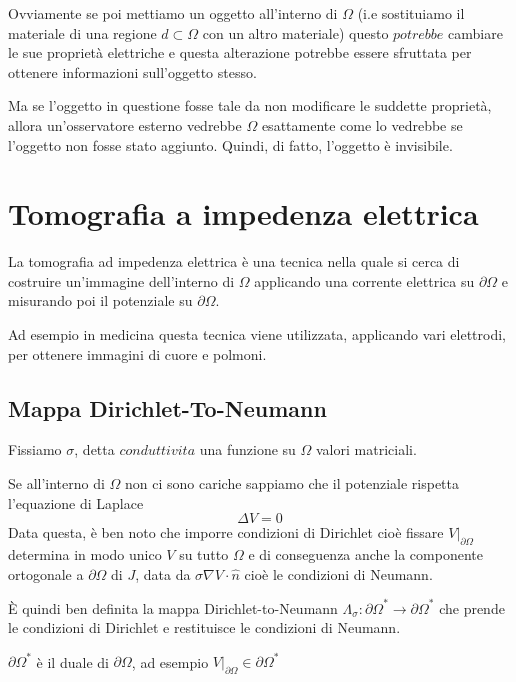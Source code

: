 \documentclass{book}
\begin{document}
Ovviamente se poi mettiamo un oggetto all'interno di $\Omega$ (i.e sostituiamo il materiale di una regione $d\subset\Omega$ con un altro materiale) questo $potrebbe$ cambiare le sue proprietà elettriche e questa alterazione potrebbe essere sfruttata per ottenere informazioni sull'oggetto stesso.

Ma se l'oggetto in questione fosse tale da non modificare le suddette proprietà, allora un'osservatore esterno vedrebbe $\Omega$ esattamente come lo vedrebbe se l'oggetto non fosse stato aggiunto. Quindi, di fatto, l'oggetto è invisibile.






\chapter{Tomografia a impedenza elettrica}
La tomografia ad impedenza elettrica è una tecnica nella quale si cerca di costruire un'immagine dell'interno di $\Omega$ applicando una corrente elettrica su $\partial\Omega$ e misurando poi il potenziale su $\partial\Omega$.

Ad esempio in medicina questa tecnica viene utilizzata, applicando vari elettrodi, per ottenere immagini di cuore e polmoni.


\section{Mappa Dirichlet-To-Neumann}
Fissiamo $\sigma$, detta $conduttivita$ una funzione su $\Omega$ valori matriciali.

Se all'interno di $\Omega$ non ci sono cariche sappiamo che il potenziale rispetta l'equazione di Laplace
\begin{equation*}
    \Delta V = 0
\end{equation*}
Data questa, è ben noto che imporre condizioni di Dirichlet cioè fissare $V|_{\partial\Omega}$ determina in modo unico $V$ su tutto $\Omega$ e di conseguenza anche la componente ortogonale a $\partial\Omega$ di $J$, data da  $\sigma\nabla V \cdot \hat n$  cioè le condizioni di Neumann.

È quindi ben definita la mappa Dirichlet-to-Neumann $\Lambda_\sigma : {\partial\Omega}^* \rightarrow {\partial\Omega}^*$ che prende le condizioni di Dirichlet e restituisce le condizioni di Neumann.

${\partial\Omega}^*$ è il duale di $\partial\Omega$, ad esempio $V|_{\partial\Omega}\in{\partial\Omega}^*$
\end{document}
